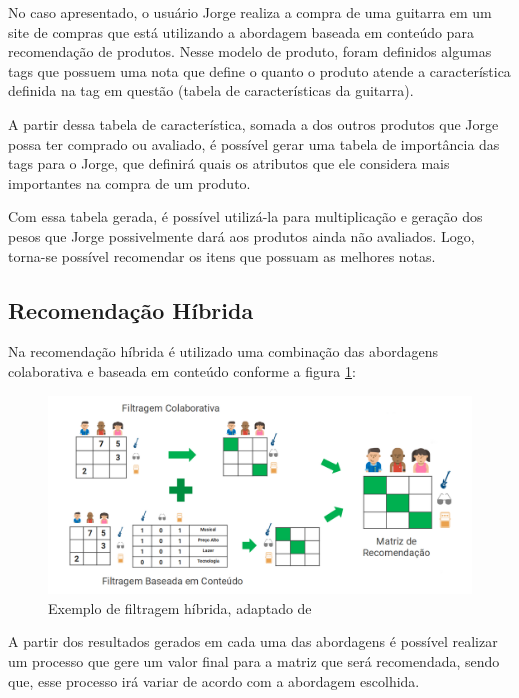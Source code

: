 No caso apresentado, o usuário Jorge realiza a compra de uma guitarra em um site de compras que está utilizando a abordagem baseada em conteúdo para recomendação de produtos. Nesse modelo de produto, foram definidos algumas tags que possuem uma nota que define o quanto o produto atende a característica definida na tag em questão (tabela de características da guitarra).

A partir dessa tabela de característica, somada a dos outros produtos que Jorge possa ter comprado ou avaliado, é possível gerar uma tabela de importância das tags para o Jorge, que definirá quais os atributos que ele considera mais importantes na compra de um produto.

Com essa tabela gerada, é possível utilizá-la para multiplicação e geração dos pesos que Jorge possivelmente dará aos produtos ainda não avaliados. Logo, torna-se possível recomendar os itens que possuam as melhores notas.

\subsection{Recomendação Híbrida}

Na recomendação híbrida é utilizado uma combinação das abordagens colaborativa e baseada em conteúdo conforme a figura \ref{fig:algoritmohibrido}:

\begin{figure}[H]
	\centering
	\includegraphics[width=1\linewidth]{imagens/hibrida.png}
	\caption[Exemplo de filtragem híbrida]{Exemplo de filtragem híbrida, adaptado de \cite{araujo2011apprecommender}}
    \label{fig:algoritmohibrido}
\end{figure}

A partir dos resultados gerados em cada uma das abordagens é possível realizar um processo que gere um valor final para a matriz que será recomendada, sendo que, esse processo irá variar de acordo com a abordagem escolhida. 

